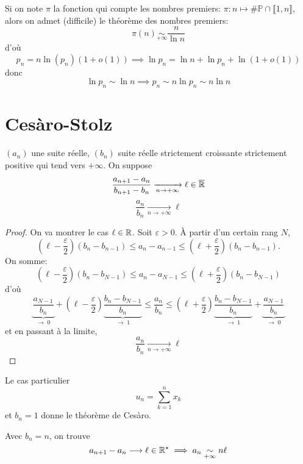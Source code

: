 \begin{rem}
    Si on note $\pi$ la fonction qui compte les nombres premiers: $\pi:n\longmapsto \#\mathbb P\cap\llbracket1,n\rrbracket$, alors on admet (difficile) le théorème des nombres premiers: \[
        \pi(n)\underset{+\infty}\sim \frac n{\ln n}
    \]
    d'où \[
    p_n=n\ln(p_n)(1+o(1))\implies \ln p_n=\ln n+\ln p_n+\ln(1+o(1))\] donc \[ \ln p_n\sim \ln n \implies p_n\sim n\ln p_n\sim n\ln n
    \]
\end{rem}

\section{Cesàro-Stolz}

\begin{thm}
    \Hyp $(a_n)$ une suite réelle, $(b_n)$ suite réelle strictement croissante strictement positive qui tend vers $+\infty$. On suppose \[
        \frac{a_{n+1}-a_n}{b_{n+1}-b_n}\xrightarrow[n\to+\infty]{}\ell\in\overline{\mathbb R}
    \]
    \Conc \[
        \frac{a_n}{b_n}\xrightarrow[n\to+\infty]{}\ell
    \]
\end{thm}

\begin{proof}
    On va montrer le cas $\ell\in\mathbb R$. Soit $\varepsilon>0$. À partir d'un certain rang $N$, \[
        \left(\ell-\frac\varepsilon2\right)(b_n-b_{n-1})\leq a_n-a_{n-1}\leq \left( \ell+\frac\varepsilon2 \right)(b_n-b_{n-1}).
    \]
    On somme: \[
        \left( \ell-\frac\varepsilon2 \right)(b_n-b_{N-1})\leq a_n-a_{N-1}\leq \left( \ell+\frac\varepsilon2 \right)(b_n-b_{N-1})
    \]
    d'où \[
        \underbrace{\frac{a_{N-1}}{b_n}}_{\to \; 0}+ \left( \ell-\frac\varepsilon2 \right)\underbrace{\frac{b_n-b_{N-1}}{b_n}}_{\to\;1}\leq \frac{a_n}{b_n}\leq \left( \ell+\frac\varepsilon2 \right)\underbrace{\frac{b_n-b_{N-1}}{b_n}}_{\to\;1}+\underbrace{\frac{a_{N-1}}{b_n}}_{\to\;0}
    \]
    et en passant à la limite, \[
        \frac{a_n}{b_n}\xrightarrow[n\to+\infty]{}\ell
    \]
\end{proof}

\begin{rem}
    Le cas particulier \[
        u_n=\sum_{k=1}^nx_k
    \]
    et $b_n=1$ donne le théorème de Cesàro.
\end{rem}

\begin{rem}
    Avec $b_n=n$, on trouve \[
        a_{n+1}-a_n\longrightarrow \ell\in\mathbb R^\star\implies a_n\underset{+\infty}\sim n\ell
    \]
\end{rem}

\endchapter
